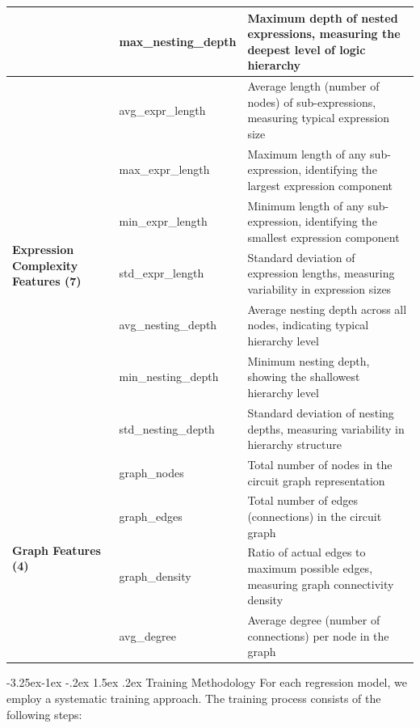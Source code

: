 \documentclass[10pt,twocolumn]{article}
\makeatletter
\renewcommand\subsection{\@startsection{subsection}{2}{\z@}%
                                     {-3.25ex\@plus -1ex \@minus -.2ex}%
                                     {1.5ex \@plus .2ex}%
                                     {\normalfont\normalsize\bfseries}}
\makeatother
\begin{document}
\begin{table}[t]
\begin{tabular}{|l|l|p{9cm}|}
 & max\_nesting\_depth & Maximum depth of nested expressions, measuring the deepest level of logic hierarchy \\
\hline
\multirow{7}{*}{\textbf{Expression Complexity Features (7)}} & avg\_expr\_length & Average length (number of nodes) of sub-expressions, measuring typical expression size \\
\cline{2-3}
 & max\_expr\_length & Maximum length of any sub-expression, identifying the largest expression component \\
\cline{2-3}
 & min\_expr\_length & Minimum length of any sub-expression, identifying the smallest expression component \\
\cline{2-3}
 & std\_expr\_length & Standard deviation of expression lengths, measuring variability in expression sizes \\
\cline{2-3}
 & avg\_nesting\_depth & Average nesting depth across all nodes, indicating typical hierarchy level \\
\cline{2-3}
 & min\_nesting\_depth & Minimum nesting depth, showing the shallowest hierarchy level \\
\cline{2-3}
 & std\_nesting\_depth & Standard deviation of nesting depths, measuring variability in hierarchy structure \\
\hline
\multirow{4}{*}{\textbf{Graph Features (4)}} & graph\_nodes & Total number of nodes in the circuit graph representation \\
\cline{2-3}
 & graph\_edges & Total number of edges (connections) in the circuit graph \\
\cline{2-3}
 & graph\_density & Ratio of actual edges to maximum possible edges, measuring graph connectivity density \\
\cline{2-3}
 & avg\_degree & Average degree (number of connections) per node in the graph \\
\hline
\end{tabular}
\end{table}

\subsection{Training Methodology}
For each regression model, we employ a systematic training approach. The training process consists of the following steps:
\end{document}
